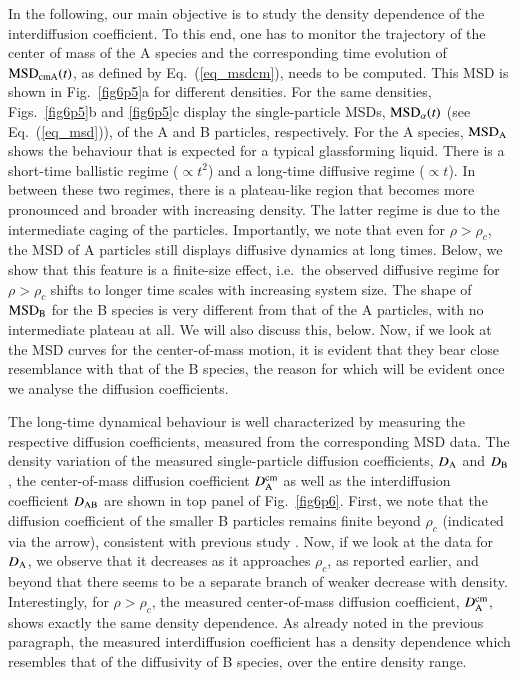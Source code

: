 In the following, our main objective is to study the density dependence of the interdiffusion coefficient. To this end, one has to monitor the trajectory of the center of mass of the A species and the corresponding time evolution of {${\rm MSD}_{\rm cmA}(t)$}, as defined by Eq.~(\ref{eq_msdcm}), needs to be computed.  This MSD is shown in Fig.~\ref{fig6p5}a for different densities.  For the same densities, Figs.~\ref{fig6p5}b and \ref{fig6p5}c display the single-particle MSDs, {${\rm MSD}_\alpha (t)$} (see Eq.~(\ref{eq_msd})), of the A and B particles, respectively.  For the A species, {${\rm MSD}_{\rm A}$} shows the behaviour that is expected for a typical glassforming liquid. There is a short-time ballistic regime ($\propto t^2$) and a long-time diffusive regime ($\propto t$). In between these two regimes, there is a plateau-like region that becomes more pronounced and broader with increasing density. The latter regime is due to the intermediate caging of the particles. Importantly, we note that even for $\rho > \rho_c$, the MSD of A particles still displays diffusive dynamics at long times. Below, we show that this feature is a finite-size effect, i.e.~the observed diffusive regime for $\rho > \rho_c$ shifts to longer time scales with increasing system size. {The shape of ${\rm MSD}_{\rm B}$ for the B species} is very different from that of the A particles, with no intermediate plateau at all. We will also discuss this, below.  Now, if we look at the MSD curves for the center-of-mass motion, it is evident that they bear close resemblance with that of the B species, the reason for which will be evident once we analyse the diffusion coefficients.


The long-time dynamical behaviour is well characterized by measuring the respective diffusion coefficients, measured from the corresponding MSD data.  The density variation of the measured single-particle diffusion coefficients, $D_{\rm A}$ and $D_{\rm B}$, the center-of-mass diffusion coefficient $D_{\rm A}^{\rm cm}$ as well as the interdiffusion coefficient $D_{\rm AB}$ are shown in top panel of Fig.~\ref{fig6p6}.  First, we note that the diffusion coefficient of the smaller B particles remains finite beyond $\rho_c$ (indicated via the arrow), consistent with previous study \cite{horbach2009}.  Now, if we look at the data for $D_{\rm A}$, we observe that it decreases as it approaches $\rho_c$, as reported earlier, and beyond that there seems to be a separate branch of weaker decrease with density. Interestingly, for $\rho > \rho_c$, the measured center-of-mass diffusion coefficient,  $D_{\rm A}^{\rm cm}$, shows exactly the same density dependence.  As already noted in the previous paragraph, the measured interdiffusion coefficient has a density dependence which resembles that of the diffusivity of B species, over the entire density range.

